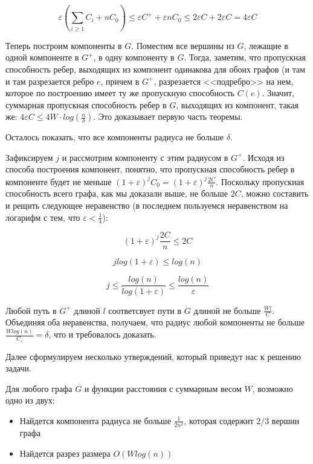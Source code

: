 \documentclass[12pt]{article} %
\begin{document}
\begin{ProofLemma}
    $$\varepsilon (\underset{i \geq 1}{\sum} C_i + n C_0) \leq \varepsilon C^{+} + \varepsilon n C_0 \leq 2 \varepsilon C + 2 \varepsilon C = 4 \varepsilon C$$
    
    Теперь построим компоненты в $G$. Поместим все вершины из $G$, лежащие в одной компоненте в $G^{+}$, в одну компоненту в $G$. Тогда, заметим, что пропускная способность ребер, выходящих из компонент одинакова для обоих графов (и там и там разрезается ребро $e$, причем в $G^{+}$, разрезается <<подребро>> на нем, которое по построению имеет ту же пропускную способность $C(e)$. Значит, суммарная пропускная способность ребер в $G$, выходящих из компонент, такая же: $4 \varepsilon C \leq 4W \cdot log(\frac{n}{\delta})$. Это доказывает первую часть теоремы.
    
    Осталось показать, что все компоненты радиуса не больше $\delta$.
    
    Зафиксируем $j$ и рассмотрим компоненту с этим радиусом в $G^{+}$. Исходя из способа построения компонент, понятно, что пропускная способность ребер в компоненте будет не меньше $(1 + \varepsilon)^j C_0 = (1 + \varepsilon)^j \frac{2C}{n}$. Поскольку пропускная способность всего графа, как мы доказали выше, не больше $2C$, можно составить и рещить следующее неравенство (в последнем пользуемся неравенством на логарифм с тем, что $\varepsilon < \frac{1}{4}$):
    
    $$(1 + \varepsilon)^j \frac{2C}{n} \leq 2C$$
    
    $$j log(1 + \varepsilon) \leq log(n)$$
    
    $$j \leq \frac{log(n)}{log(1 + \varepsilon)} \leq \frac{log(n)}{\varepsilon}$$
    
    Любой путь в $G^{+}$ длиной $l$ соответсвует пути в $G$ длиной не больше $\frac{W l}{C}$. Объединяя оба неравенства, получаем, что радиус любой компоненты не больше $\frac{W log(n)}{C_{\varepsilon}} = \delta$, что и требовалось доказать.
\end{ProofLemma}

Далее сформулируем несколько утверждений, который приведут нас к решению задачи.

\begin{Corollary}
    Для любого графа $G$ и функции расстояния с суммарным весом $W$, возможно одно из двух:
    \begin{itemize}
    \item
        Найдется компонента радиуса не больше $\frac{1}{2n^2}$, которая содержит $2/3$ вершин графа
    \item
        Найдется разрез размера $O(W log(n))$
    \end{itemize}
\end{Corollary}
\end{document}
